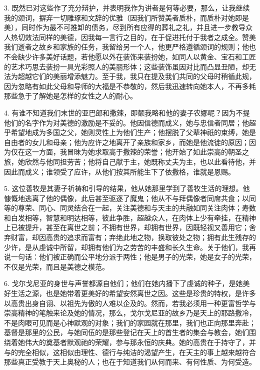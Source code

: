 3. 既然已对这些作了充分辩护，并表明我作为讲者是何等必要，那么，让我继续我的颂词，摒弃一切雕琢和文辞的优雅（因我们所赞美者质朴，而质朴对她即是美），同时作为最不可推卸的债务，尽到所有应得的葬礼之礼，并且进一步教导众人热切效法同样的美德，因我每一言行之目的，在于促进托付于我者之成全。赞美我们逝者之故乡和家族的任务，我留给另一个人，他更严格遵循颂词的规则；他也不会缺少许多美好话题，若他愿以外在装饰来装扮她，如同人以黄金、宝石和工匠的艺术巧思去装扮一具光彩照人的美丽形体；这些装饰虽因对比而凸显丑陋，却无法为超越它们的美丽增添魅力。至于我，我只在提及我们共同的父母时稍循此规，因为忽略有如此父母和导师的大福是不恭敬的，然后我迅速转向她本人，不再多耗那些急于了解她是怎样的女性之人的耐心。\par

4. 有谁不知道我们末世的亚巴郎和撒辣，即额我略和他的妻子农娜呢？因为不提他们的名字作为对美德的激励是不妥的。他因信德而成义，她与忠信者同居；他超乎希望地成为多国之父，她则灵性上为他们生产；他摆脱了父辈神祇的束缚，她是自由者的女儿和母亲；他为应许之地离开了亲族和家乡，而她是他流徙的原因；因为仅在这一方面，我冒昧为她求取高于撒辣的荣誉；他开始了如此崇高的朝圣之旅，她欣然与他同担劳苦；他将自己献于主，她既称丈夫为主，也以此看待他，并因此而成义；谁领受了应许，从他们按其所能生下了依撒格，谁就是恩赐。\par

5. 这位善牧是其妻子祈祷和引导的结果，他从她那里学到了善牧生活的理想。他慷慨地逃离了他的偶像，此后甚至驱逐了魔鬼；他从不与拜偶像者同席共食；以同等的尊荣、同心、同灵结合在一起，关注美德和与天主的共融如同关注肉体；寿数和白发相等，智慧和明达相等，彼此争胜，超越众人，在肉体上少有牵挂，在精神上已被提升，甚至在离世之前；不拥有世界，却拥有世界，因既轻视又善用它；舍弃财富，却因高贵的追求而富有；弃绝此地之物，换取彼处之物；拥有此生残存的少许，是从虔诚中所留，却拥有他们为之劳苦的丰盛和长久生命。关于他们，我再说一句话：他们被正确而公平地分派于两性；他是男子的光荣，她是女子的光荣，不仅是光荣，而且是美德之模范。\par

6. 戈尔戈尼亚的身世与声誉都源自他们；他们在她内播下了虔诚的种子，是她美好生活之源，也是她带着更美好的希望安然离世之因。这些是珍贵的特权，是许多以高贵出身自诩、以祖先为傲的人难以企及的。然而，若我必须用一种更富哲学与崇高精神的笔触来论及她的情况，那么，戈尔戈尼亚的故乡乃是天上的耶路撒冷，不是肉眼可见而是心神默观的对象；我们的家园就在那里，我们也正向那里奔赴；基督是那里的公民，与她同伍的是那些登记在天上的首生者的集会与教会，她们围绕着她伟大的奠基者默观祂的荣耀，参与那永恒的庆典。她的高贵在于持守了，并与的完全相似，这相似由理性、德行与纯洁的渴望产生，在天主的事上越来越符合那些真正受教于天上奥秘的人；也在于知道我们从何而来、有何性质、为何受造。\par

